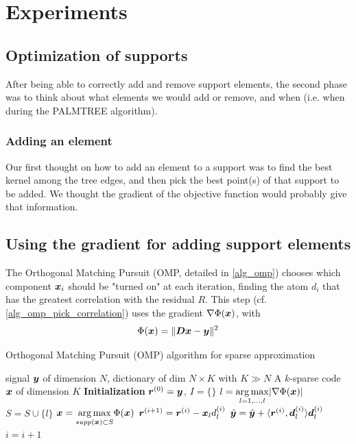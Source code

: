 \chapter{Experiments}

\section{Optimization of supports}

After being able to correctly add and remove support elements, the second phase was to think about what elements we would add or remove, and when (i.e. when during the PALMTREE algorithm).


\subsection{Adding an element}
Our first thought on how to add an element to a support was to find the best kernel among the tree edges, and then pick the best point(s) of that support to be added. We thought the gradient of the objective function would probably give that information. 


\section{Using the gradient for adding support elements}

The Orthogonal Matching Pursuit (OMP, detailed in \cref{alg_omp}) chooses which component $\bm{x}_i$ should be "turned on" at each iteration, finding the atom $d_i$ that has the greatest correlation with the residual $R$. This step (cf. \cref{alg_omp_pick_correlation}) uses the gradient $\nabla \Phi(\bm{x})$, with $$\Phi(\bm{x}) = \lVert \bm{D}\bm{x} - \bm{y} \rVert^2$$


\begin{algorithm}[!ht]
    \caption{Orthogonal Matching Pursuit (OMP) algorithm for sparse approximation}\label{alg_omp}
  \begin{algorithmic}[1]
    \Input signal $\bm{y}$ of dimension $N$, dictionary of dim $N \times K$ with $K \gg N$
    \Output A $k$-sparse code $\bm{x}$ of dimension $K$
    \State \textbf{Initialization} $\bm{r}^{(0)} = \bm{y}$, $I=\{\}$
      \State $l =  \underset{l = 1,\dots,l}{\arg\max} | \nabla \Phi(\bm{x}) |$ \label{alg_omp_pick_correlation}
      \State $S = S \cup \{l\}$
      \State $\bm{x} = \underset{supp(\bm{x}) \subset S}{\arg\max} \Phi(\bm{x})$
      \State $\bm{r}^{(i+1)} = \bm{r}^{(i)}-\bm{x}_l d_l^{(i)}$
      \State $\hat{\bm{y}} = \hat{\bm{y}}+\langle \bm{r}^{(i)}, \bm{d}_{l}^{(i)} \rangle \bm{d}_{l}^{(i)}$
      \State $i = i + 1$
    \EndWhile
  \end{algorithmic}
\end{algorithm}


